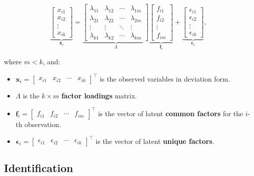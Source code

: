 \documentclass[12pt]{article}
\begin{document}
\[
\underbrace{\begin{bmatrix}
x_{i1} \\
x_{i2} \\
\vdots \\
x_{ik}
\end{bmatrix}}_{\mathbf{x}_i}
=
\underbrace{\begin{bmatrix}
\lambda_{11} & \lambda_{12} & \cdots & \lambda_{1m} \\
\lambda_{21} & \lambda_{22} & \cdots & \lambda_{2m} \\
\vdots & \vdots & \ddots & \vdots \\
\lambda_{k1} & \lambda_{k2} & \cdots & \lambda_{km}
\end{bmatrix}}_{\Lambda}
\underbrace{\begin{bmatrix}
f_{i1} \\
f_{i2} \\
\vdots \\
f_{im}
\end{bmatrix}}_{\mathbf{f}_i}
+
\underbrace{\begin{bmatrix}
\epsilon_{i1} \\
\epsilon_{i2} \\
\vdots \\
\epsilon_{ik}
\end{bmatrix}}_{\boldsymbol{\epsilon}_i},
\]

where $m < k$, and:
\begin{itemize}
    \item $\mathbf{x}_i = \begin{bmatrix} x_{i1} & x_{i2} & \cdots & x_{ik} \end{bmatrix}^\top$ is the observed variables in deviation form.
    \item $\Lambda$ is the $k \times m$ \textbf{factor loadings} matrix.
    \item $\mathbf{f}_i = \begin{bmatrix} f_{i1} & f_{i2} & \cdots & f_{im} \end{bmatrix}^\top$ is the vector of latent \textbf{common factors} for the $i$-th observation.
    \item $\boldsymbol{\epsilon}_i = \begin{bmatrix} \epsilon_{i1} & \epsilon_{i2} & \cdots & \epsilon_{ik} \end{bmatrix}^\top$ is the vector of latent \textbf{unique factors}.
\end{itemize}

\subsection{Identification}
\end{document}
